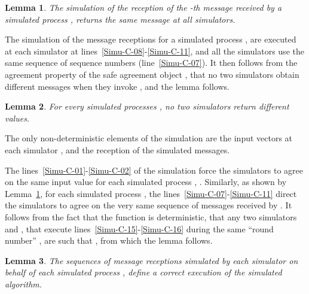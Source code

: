 \documentclass[11pt,letterpaper]{article}
\newtheorem{lemma}{Lemma}
\newlength {\afterproof}
\newcommand{\toto}{xxx}
\newenvironment{proofL}{\noindent{\bf Proof }}
{\hspace*{\fill}\par\vspace{\afterproof}}
\begin{document}
\begin{lemma}
\label{lemma:same-seq-of-messages}
The simulation of the reception of the -th
message received by a simulated process , returns the same message
at all simulators.
\end{lemma}

\begin{proofL}
The simulation of the message receptions for a simulated process ,
are executed at each simulator  at lines~\ref{Simu-C-08}-\ref{Simu-C-11},
and all the simulators use the same sequence of sequence numbers
(line~\ref{Simu-C-07}).
It then follows from the agreement property of the safe agreement object
, that no two simulators obtain different messages
when they invoke  , and the lemma follows.
\renewcommand{\toto}{lemma:same-seq-of-messages}
\end{proofL}

\begin{lemma}
\label{lemma:one-dec-value}
For every simulated processes , no two simulators return
different values.
\end{lemma}

\begin{proofL}
The only non-deterministic elements of the simulation are the input vectors
 at each simulator , and the reception of the simulated
messages.

The lines~\ref{Simu-C-01}-\ref{Simu-C-02} of the
simulation force  the simulators to agree on the same input value
for each simulated process , .
Similarly,  as shown by Lemma~\ref{lemma:same-seq-of-messages},
for each simulated process , the lines~\ref{Simu-C-07}-\ref{Simu-C-11}
direct the simulators to  agree on the very same sequence of messages
received by . It follows from the fact that the function 
is deterministic, that   any two simulators  and ,
that execute  lines~\ref{Simu-C-15}-\ref{Simu-C-16} during the
same ``round number'' , are such that ,
from which the lemma follows.
\renewcommand{\toto}{lemma:one-dec-value}
\end{proofL}

\begin{lemma}
\label{lemma:correct-simulation}
The sequences of message receptions simulated by each simulator 
on behalf of each simulated process , define a correct execution of
the simulated algorithm.
\end{lemma}
\end{document}
